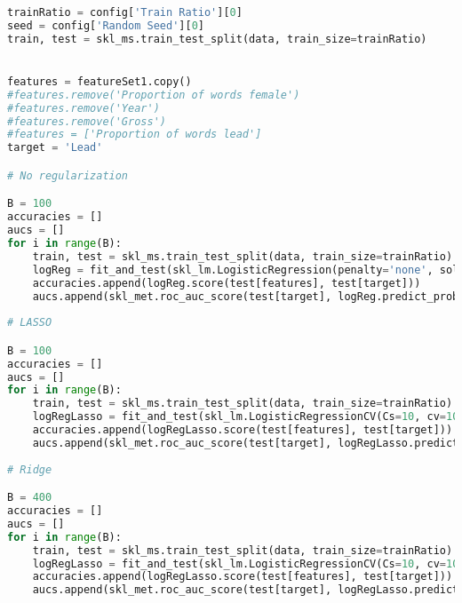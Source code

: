 \documentclass[../../project.tex]{subfiles}
\begin{document}
	\begin{lstlisting}[language=Python]
trainRatio = config['Train Ratio'][0]
seed = config['Random Seed'][0]
train, test = skl_ms.train_test_split(data, train_size=trainRatio)


features = featureSet1.copy()
#features.remove('Proportion of words female')
#features.remove('Year')
#features.remove('Gross')
#features = ['Proportion of words lead']
target = 'Lead'

# No regularization

B = 100
accuracies = []
aucs = []
for i in range(B):
	train, test = skl_ms.train_test_split(data, train_size=trainRatio)
	logReg = fit_and_test(skl_lm.LogisticRegression(penalty='none', solver='newton-cg'), train, test, features, target, suppress_output=True)
	accuracies.append(logReg.score(test[features], test[target]))
	aucs.append(skl_met.roc_auc_score(test[target], logReg.predict_proba(test[features])[:,1]))
	
# LASSO

B = 100
accuracies = []
aucs = []
for i in range(B):
	train, test = skl_ms.train_test_split(data, train_size=trainRatio)
	logRegLasso = fit_and_test(skl_lm.LogisticRegressionCV(Cs=10, cv=10, penalty='l1', solver='liblinear', n_jobs=10), train, test, features, target, suppress_output=True)
	accuracies.append(logRegLasso.score(test[features], test[target]))
	aucs.append(skl_met.roc_auc_score(test[target], logRegLasso.predict_proba(test[features])[:,1]))
	
# Ridge

B = 400
accuracies = []
aucs = []
for i in range(B):
	train, test = skl_ms.train_test_split(data, train_size=trainRatio)
	logRegLasso = fit_and_test(skl_lm.LogisticRegressionCV(Cs=10, cv=10, penalty='l2', solver='liblinear', n_jobs=10), train, test, features, target, suppress_output=True)
	accuracies.append(logRegLasso.score(test[features], test[target]))
	aucs.append(skl_met.roc_auc_score(test[target], logRegLasso.predict_proba(test[features])[:,1]))
	\end{lstlisting}
\end{document}
